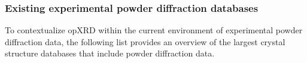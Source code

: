 

\pagebreak

\subsubsection*{Existing experimental powder diffraction databases}
To contextualize opXRD within the current environment of experimental powder diffraction data, the following list provides an overview of the largest crystal structure databases that include powder diffraction data.  \\

